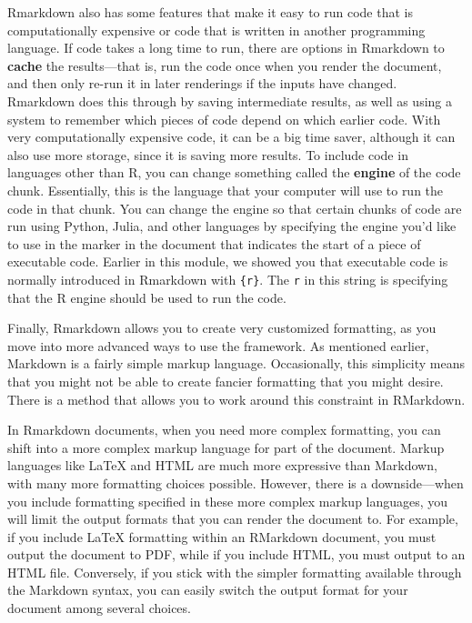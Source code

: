 \documentclass[]{tufte-book}
\begin{document}
Rmarkdown also has some features that make it easy to run code that is
computationally expensive or code that is written in another programming
language. If code takes a long time to run, there are options in Rmarkdown to
\textbf{cache} the results---that is, run the code once when you render the document,
and then only re-run it in later renderings if the inputs have changed. Rmarkdown
does this through by saving intermediate results, as well as using a system to
remember which pieces of code depend on which earlier code. With very computationally
expensive code, it can be a big time saver, although it can also use more storage,
since it is saving more results. To include code in languages other than R, you can
change something called the \textbf{engine} of the code chunk. Essentially, this is the
language that your computer will use to run the code in that chunk. You can change
the engine so that certain chunks of code are run using Python, Julia, and other
languages by specifying the engine you'd like to use in the marker in the document
that indicates the start of a piece of executable code. Earlier in this module,
we showed you that executable code is normally introduced in Rmarkdown with
\texttt{\textasciigrave{}\textasciigrave{}\textasciigrave{}\{r\}}. The \texttt{r} in this string is specifying that the R engine should be
used to run the code.

Finally, Rmarkdown allows you to create very customized formatting, as you move into
more advanced ways to use the framework.
As mentioned earlier, Markdown is a fairly simple markup language. Occasionally,
this simplicity means that you might not be able to create fancier formatting
that you might desire. There is a method that allows you to work around this
constraint in RMarkdown.

In Rmarkdown documents, when you need more complex formatting, you can shift
into a more complex markup language for part of the document. Markup languages
like LaTeX and HTML are much more expressive than Markdown, with many more
formatting choices possible. However,
there is a downside---when you include formatting specified in these
more complex markup languages, you will limit the output formats that you can
render the document to. For example, if you include LaTeX formatting within
an RMarkdown document, you must output the document to PDF, while if you
include HTML, you must output to an HTML file. Conversely, if you stick with
the simpler formatting available through the Markdown syntax, you can easily
switch the output format for your document among several choices.
\end{document}
